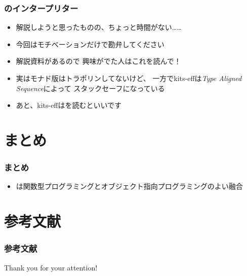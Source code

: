 \begin{frame}
  \frametitle{\Fujitask のインタープリター}

  \begin{itemize}
    \item<+-> 解説しようと思ったものの、ちょっと時間がない……

    \item<+-> 今回はモチベーションだけで勘弁してください

    \item<+-> 解説資料\cite{qiita_fujitask_eff}があるので
    興味がでた人はこれを読んで！

    \item<+-> 実はモナド版はトラポリンしてないけど、
    一方でkits-effは\emph{Type Aligned Sequence}によって
    スタックセーフになっている

    \item<+-> あと、kits-effは\cite{shinchoku}を読むといいです
  \end{itemize}
\end{frame}

\section{まとめ}

\begin{frame}
  \frametitle{まとめ}

  \pause
  \begin{itemize}
    \item<+-> \Fujitask は関数型プログラミングとオブジェクト指向プログラミングのよい融合
  \end{itemize}
\end{frame}

\section*{参考文献}

\begin{frame}
  \frametitle{参考文献}

  
  \nocite{*}
  
\end{frame}

\begin{frame}
  \centering
  {\Huge Thank you for your attention!}
\end{frame}


